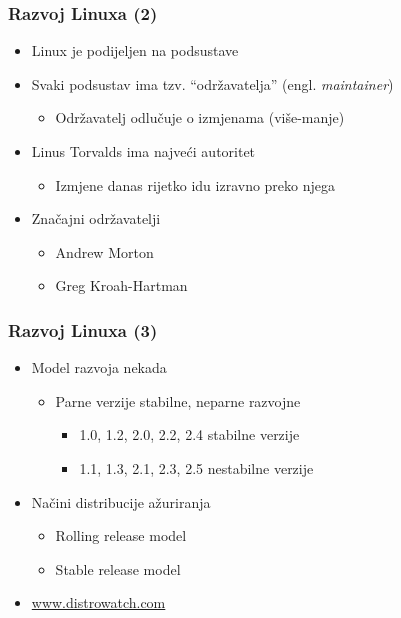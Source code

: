 \documentclass{beamer}
\begin{document}
\begin{frame}[t]
\frametitle{Razvoj Linuxa (2)}
\begin{itemize}
  \item Linux je podijeljen na podsustave
  \item Svaki podsustav ima tzv. ``održavatelja'' (engl.
        \emph{maintainer})
  \begin{itemize}
    \item Održavatelj odlučuje o izmjenama (više-manje)
  \end{itemize}
  \item Linus Torvalds ima najveći autoritet
  \begin{itemize}
    \item Izmjene danas rijetko idu izravno preko njega
  \end{itemize}
  \item Značajni održavatelji
  \begin{itemize}
    \item Andrew Morton
    \item Greg Kroah-Hartman
  \end{itemize}
\end{itemize}
\end{frame}

\begin{frame}[t]
\frametitle{Razvoj Linuxa (3)}
\begin{itemize}
  \item Model razvoja nekada
  \begin{itemize}
    \item Parne verzije stabilne, neparne razvojne
    \begin{itemize}
      \item 1.0, 1.2, 2.0, 2.2, 2.4 stabilne verzije
      \item 1.1, 1.3, 2.1, 2.3, 2.5 nestabilne verzije
    \end{itemize}
  \end{itemize}
  \item Načini distribucije ažuriranja
  \begin{itemize}
    \item Rolling release model
    \item Stable release model
  \end{itemize}
  \item \url{www.distrowatch.com}
\end{itemize}
\end{frame}
\end{document}

